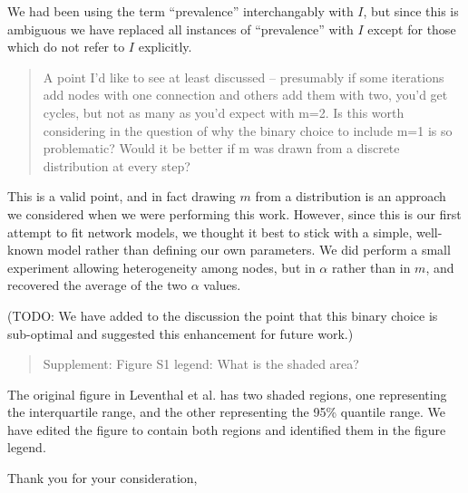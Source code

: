 \documentclass[12pt]{letter}
\begin{document}
\begin{letter}{ }
We had been using the term ``prevalence'' interchangably with $I$, but since
this is ambiguous we have replaced all instances of ``prevalence'' with $I$
except for those which do not refer to $I$ explicitly.

\begin{quote}
  \itshape

  A point I’d like to see at least discussed – presumably if some iterations
  add nodes with one connection and others add them with two, you’d get cycles,
  but not as many as you’d expect with m=2. Is this worth considering in the
  question of why the binary choice to include m=1 is so problematic? Would it
  be better if m was drawn from a discrete distribution at every step?
\end{quote}

This is a valid point, and in fact drawing $m$ from a distribution is an
approach we considered when we were performing this work. However, since this
is our first attempt to fit network models, we thought it best to stick with
a simple, well-known model rather than defining our own parameters. We did
perform a small experiment allowing heterogeneity among nodes, but in $\alpha$
rather than in $m$, and recovered the average of the two $\alpha$ values.

(TODO: We
have added to the discussion the point that this binary choice is sub-optimal
and suggested this enhancement for future work.)

\begin{quote}
  Supplement:
  Figure S1 legend: What is the shaded area?
\end{quote}

The original figure in Leventhal et al. has two shaded regions, one
representing the interquartile range, and the other representing the 95\%
quantile range. We have edited the figure to contain both regions and
identified them in the figure legend.

\closing{Thank you for your consideration,}
\end{letter}
\end{document}
